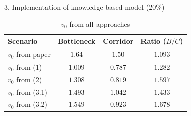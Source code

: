 \begin{task}{3, Implementation of knowledge-based model (20\%)}
\begin{table}[H]
\centering
\begin{tabular}{ |l|c|c|c| }
\hline
Scenario & Bottleneck & Corridor & Ratio ($B/C$)\\
\hline
$v_0$ from paper & $1.64$ & $1.50$ & $1.093$\\
\hline
$v_0$ from (1) & $1.009$ & $0.787$ & $1.282$\\
\hline
$v_0$ from (2) & $1.308$ & $0.819$ & $1.597$\\
\hline
$v_0$ from (3.1) & $1.493$ & $1.042$ & $1.433$\\
\hline
$v_0$ from (3.2) & $1.549$ & $0.923$ & $1.678$\\
\hline
\end{tabular}
\caption{$v_0$ from all approaches}
\label{Tab:v0complete}
\end{table}

\end{task}